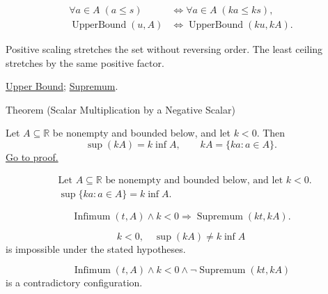 \begin{remark*}
\[
\begin{aligned}
\forall a\in A\;(a\le s)
&\Longleftrightarrow
\forall a\in A\;(ka\le ks),\\
\operatorname{UpperBound}(u,A)
&\Longleftrightarrow
\operatorname{UpperBound}(ku,kA).
\end{aligned}
\]
\end{remark*}

\begin{remark*}[Interpretation]
Positive scaling stretches the set without reversing order. The least ceiling stretches by the same positive factor.
\end{remark*}

\begin{remark*}[Dependencies]
\hyperref[def:upper-bound]{Upper Bound};
\hyperref[def:supremum]{Supremum}.
\end{remark*}


\begin{theorembox}{Theorem (Scalar Multiplication by a Negative Scalar)}
\begin{theorem}
\label{thm:scalar-mult-negative}
Let $A\subseteq\mathbb{R}$ be nonempty and bounded below, and let $k<0$. Then
\[
  \sup(kA)=k\inf A,
  \qquad
  kA=\{ka:a\in A\}.
\]
\hyperref[prf:scalar-mult-negative]{Go to proof.}
\end{theorem}
\end{theorembox}

\begin{remark*}
\[
\begin{aligned}
&\text{Let }A\subseteq\mathbb{R}\text{ be nonempty and bounded below, and let }k<0.\\
&\sup\{ka:a\in A\}=k\inf A.
\end{aligned}
\]
\end{remark*}

\begin{remark*}
\[
\operatorname{Infimum}(t,A)\land k<0
\Longrightarrow
\operatorname{Supremum}(kt,kA).
\]
\end{remark*}

\begin{remark*}
\[
k<0,\quad \sup(kA)\ne k\inf A
\]
is impossible under the stated hypotheses.
\end{remark*}

\begin{remark*}
\[
\operatorname{Infimum}(t,A)\land k<0\land \neg\operatorname{Supremum}(kt,kA)
\]
is a contradictory configuration.
\end{remark*}

